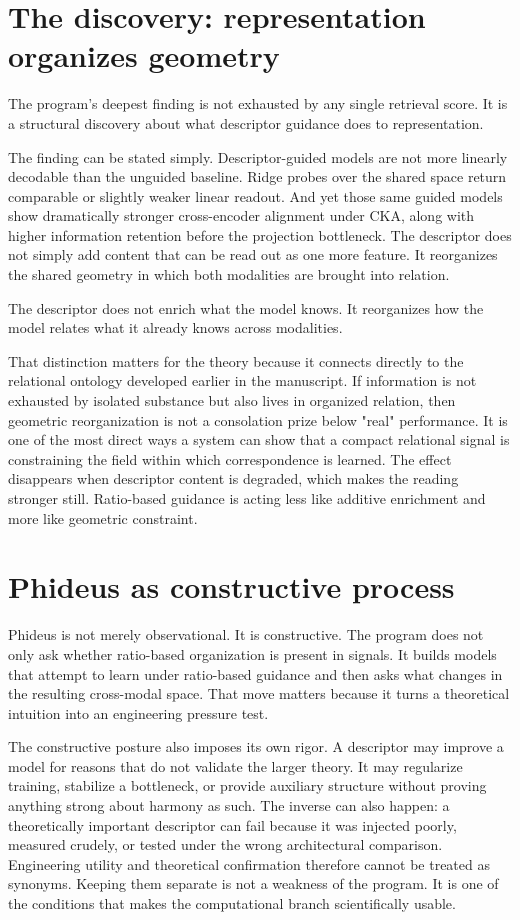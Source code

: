 \section{The discovery: representation organizes geometry}


The program's deepest finding is not exhausted by any single retrieval score. It is a structural discovery about what descriptor guidance does to representation.

The finding can be stated simply. Descriptor-guided models are not more linearly decodable than the unguided baseline. Ridge probes over the shared space return comparable or slightly weaker linear readout. And yet those same guided models show dramatically stronger cross-encoder alignment under CKA, along with higher information retention before the projection bottleneck. The descriptor does not simply add content that can be read out as one more feature. It reorganizes the shared geometry in which both modalities are brought into relation.

The descriptor does not enrich what the model knows. It reorganizes how the model relates what it already knows across modalities.

That distinction matters for the theory because it connects directly to the relational ontology developed earlier in the manuscript. If information is not exhausted by isolated substance but also lives in organized relation, then geometric reorganization is not a consolation prize below "real" performance. It is one of the most direct ways a system can show that a compact relational signal is constraining the field within which correspondence is learned. The effect disappears when descriptor content is degraded, which makes the reading stronger still. Ratio-based guidance is acting less like additive enrichment and more like geometric constraint.


\section{Phideus as constructive process}


Phideus is not merely observational. It is constructive. The program does not only ask whether ratio-based organization is present in signals. It builds models that attempt to learn under ratio-based guidance and then asks what changes in the resulting cross-modal space. That move matters because it turns a theoretical intuition into an engineering pressure test.

The constructive posture also imposes its own rigor. A descriptor may improve a model for reasons that do not validate the larger theory. It may regularize training, stabilize a bottleneck, or provide auxiliary structure without proving anything strong about harmony as such. The inverse can also happen: a theoretically important descriptor can fail because it was injected poorly, measured crudely, or tested under the wrong architectural comparison. Engineering utility and theoretical confirmation therefore cannot be treated as synonyms. Keeping them separate is not a weakness of the program. It is one of the conditions that makes the computational branch scientifically usable.


